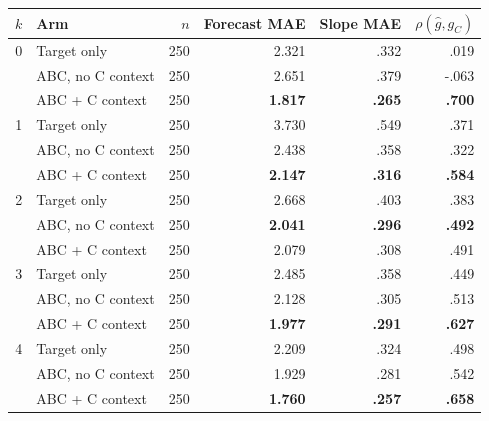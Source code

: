\begingroup
\setlength{\topsep}{3pt}
\setlength{\partopsep}{0pt}
\setlength{\parsep}{0pt}
\setlength{\itemsep}{0pt}
\begin{center}
\begin{minipage}{\linewidth}
\centering
{}
\label{tab:coin-city-recovery}
\small
\begin{tabular}{c l r r r r}
\toprule
$k$ & Arm & $n$ & Forecast MAE & Slope MAE & $\rho(\hat g,g_C)$ \\
\midrule
0 & Target only & 250 & 2.321 & .332 & .019 \\
  & ABC, no C context & 250 & 2.651 & .379 & -.063 \\
  & ABC + C context & 250 & \textbf{1.817} & \textbf{.265} & \textbf{.700} \\
\midrule
1 & Target only & 250 & 3.730 & .549 & .371 \\
  & ABC, no C context & 250 & 2.438 & .358 & .322 \\
  & ABC + C context & 250 & \textbf{2.147} & \textbf{.316} & \textbf{.584} \\
\midrule
2 & Target only & 250 & 2.668 & .403 & .383 \\
  & ABC, no C context & 250 & \textbf{2.041} & \textbf{.296} & \textbf{.492} \\
  & ABC + C context & 250 & 2.079 & .308 & .491 \\
\midrule
3 & Target only & 250 & 2.485 & .358 & .449 \\
  & ABC, no C context & 250 & 2.128 & .305 & .513 \\
  & ABC + C context & 250 & \textbf{1.977} & \textbf{.291} & \textbf{.627} \\
\midrule
4 & Target only & 250 & 2.209 & .324 & .498 \\
  & ABC, no C context & 250 & 1.929 & .281 & .542 \\
  & ABC + C context & 250 & \textbf{1.760} & \textbf{.257} & \textbf{.658} \\
\bottomrule
\end{tabular}
\end{minipage}
\end{center}


